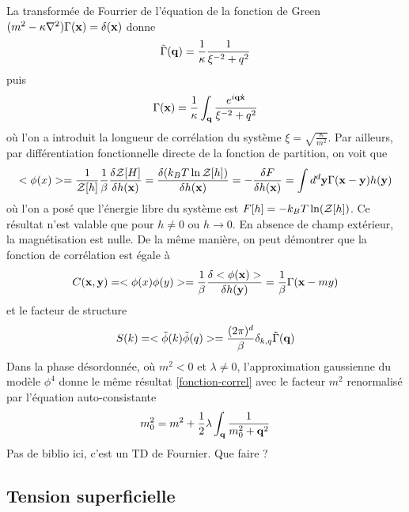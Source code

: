 La transformée de Fourrier de l'équation de la fonction de Green $(m^2-\kappa \nabla^2) \Gamma({\bf x}) = \delta({\bf x})$ donne
\begin{align}
    \tilde{\Gamma}({\bf q}) = \frac{1}{\kappa} \frac{1}{\xi^{-2} +  q^2}
\end{align}
puis
\begin{align}
    \Gamma({\bf x}) = \frac{1}{\kappa} \int_{\bf q} \frac{e^{i {\bf q} \dot {{\bf x}}}}{\xi^{-2} +  q^2}
    \label{fonction-correl}
\end{align}
où l'on a introduit la longueur de corrélation du système $\xi = \sqrt{\frac{\kappa}{m^2}}$.
Par ailleurs, par différentiation fonctionnelle directe de la fonction de partition, on voit que
\begin{align}
    <\phi(x)> = \frac{1}{\mathcal{Z}[h]} \frac{1}{\beta} \frac{\delta \mathcal{Z}[H]}{\delta h({\bf x})} = \frac{\delta (k_B T \ln \mathcal{Z}[h])}{\delta h({\bf x})} = - \frac{\delta F}{\delta h({\bf x})} = \int d^d {\bf y} \Gamma({\bf x}-{\bf y}) h({\bf y})
\end{align} 
où l'on a posé que l'énergie libre du système est $F[h] = -k_B T \ln(\mathcal{Z}[h])$. Ce résultat n'est valable que pour $h \neq 0$ ou $h \to 0$. En absence de champ extérieur, la magnétisation est nulle.
De la même manière, on peut démontrer que la fonction de corrélation est égale à 
\begin{align}
    C({\bf x},{\bf y}) =  <\phi(x)\phi(y)> = \frac{1}{\beta} \frac{\delta <\phi({\bf x})>}{\delta h({\bf y})} = \frac{1}{\beta} \Gamma({\bf x}-my)
\end{align}
et le facteur de structure
\begin{align}
    S(k) = < \tilde{\phi}(k)\tilde{\phi}(q)> = \frac{(2\pi)^d}{\beta} \delta_{k,q}  \tilde{\Gamma}({\bf q})
\end{align}
Dans la phase désordonnée, où $m^2 \less 0$ et $\lambda \neq 0$, l'approximation gaussienne du modèle $\phi^4$ donne le même résultat \ref{fonction-correl} avec le facteur $m^2$ renormalisé par l'équation auto-consistante
\begin{align}
    m^2_0 = m^2 + \frac{1}{2} \lambda \int_{\bf q} \frac{1}{m^2_0+{\bf q}^2}
\end{align}
{\color{red} Pas de biblio ici, c'est un TD de Fournier. Que faire ? }

    \subsection{Tension superficielle}

